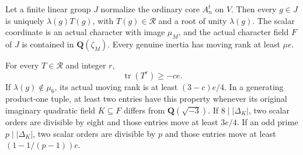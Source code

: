 \begin{lemma}
\label{D-ATT-02}
Let a finite linear group $J$ normalize the ordinary core $A_n^t$
on $V$. Then every $g\in J$ is uniquely $\lambda(g)T(g)$,
with $T(g)\in\mathcal R$ and a root of unity $\lambda(g)$.
The scalar coordinate is an actual character with image $\mu_M$,
and the actual character field $F$ of $J$ is contained in
$\mathbf Q(\zeta_M)$. Every genuine inertia has moving rank
at least $\mu e$.

For every $T\in\mathcal R$ and integer $r$,
\[
                      \operatorname{tr}(T^r)\ge-ce.        \tag{ATT.7}
\]
If $\lambda(g)\notin\mu_6$, its actual moving rank is at least
$(3-c)e/4$. In a generating product-one tuple, at least two
entries have this property whenever its original imaginary
quadratic field $K\subseteq F$ differs from $\mathbf Q(\sqrt{-3})$.
If $8\mid|\Delta_K|$, two scalar orders are divisible by eight
and those entries move at least $3e/4$. If an odd prime
$p\mid|\Delta_K|$, two scalar orders are divisible by $p$
and those entries move at least $(1-1/(p-1))e$.
\end{lemma}

